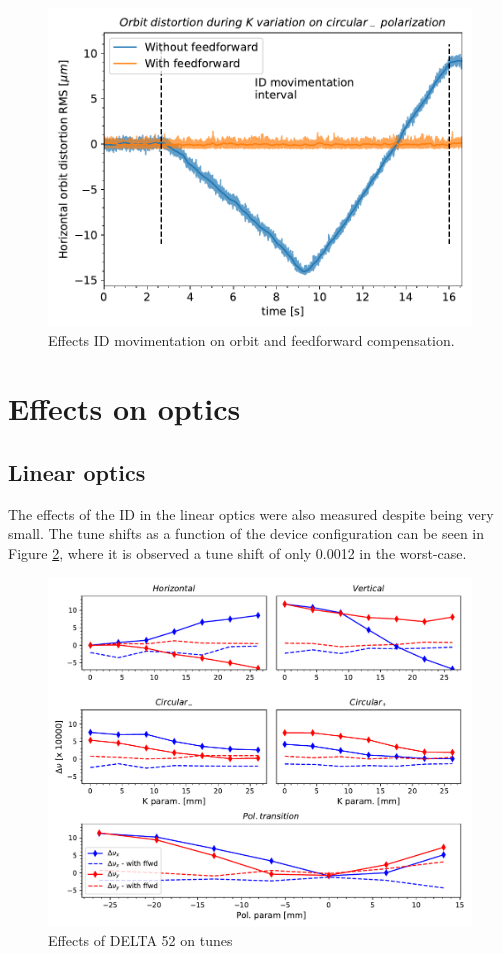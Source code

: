 \documentclass[a4paper,
               keeplastbox,   %
               ]{jacow}
\begin{document}
\begin{figure}[!h]
    \centering
   \includegraphics[width=0.8\columnwidth]{THPS18_f4.pdf}
   \caption{Effects ID movimentation on orbit and feedforward compensation.}
   \label{fig:orbit_fast}
\end{figure}

\section{Effects on optics}
\subsection{Linear optics}

The effects of the ID in the linear optics were also measured despite being very small. The tune shifts as a function of the device configuration can be seen in Figure \ref{fig:tunes}, where it is observed a tune shift of only 0.0012 in the worst-case.

\begin{figure}[!h]
    \centering
   \includegraphics[width=\columnwidth]{THPS18_f3.pdf}
   \caption{Effects of DELTA 52 on tunes}
   \label{fig:tunes}
\end{figure}
\end{document}
